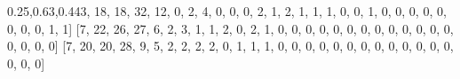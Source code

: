 \documentclass[
]{article}
\newenvironment{Shaded}{}{}
\newcommand{\DecValTok}[1]{\textcolor[rgb]{0.25,0.63,0.44}{#1}}
\newcommand{\NormalTok}[1]{#1}
\begin{document}
\begin{Shaded}
\begin{Highlighting}[]
\NormalTok{[}\DecValTok{3}\NormalTok{, }\DecValTok{18}\NormalTok{, }\DecValTok{18}\NormalTok{, }\DecValTok{32}\NormalTok{, }\DecValTok{12}\NormalTok{, }\DecValTok{0}\NormalTok{, }\DecValTok{2}\NormalTok{, }\DecValTok{4}\NormalTok{, }\DecValTok{0}\NormalTok{, }\DecValTok{0}\NormalTok{, }\DecValTok{0}\NormalTok{, }\DecValTok{2}\NormalTok{, }\DecValTok{1}\NormalTok{, }\DecValTok{2}\NormalTok{, }
\DecValTok{1}\NormalTok{, }\DecValTok{1}\NormalTok{, }\DecValTok{1}\NormalTok{, }\DecValTok{0}\NormalTok{, }\DecValTok{0}\NormalTok{, }\DecValTok{1}\NormalTok{, }\DecValTok{0}\NormalTok{, }\DecValTok{0}\NormalTok{, }\DecValTok{0}\NormalTok{, }\DecValTok{0}\NormalTok{, }\DecValTok{0}\NormalTok{, }\DecValTok{0}\NormalTok{, }\DecValTok{0}\NormalTok{, }\DecValTok{0}\NormalTok{, }\DecValTok{1}\NormalTok{, }\DecValTok{1}\NormalTok{]}
\NormalTok{[}\DecValTok{7}\NormalTok{, }\DecValTok{22}\NormalTok{, }\DecValTok{26}\NormalTok{, }\DecValTok{27}\NormalTok{, }\DecValTok{6}\NormalTok{, }\DecValTok{2}\NormalTok{, }\DecValTok{3}\NormalTok{, }\DecValTok{1}\NormalTok{, }\DecValTok{1}\NormalTok{, }\DecValTok{2}\NormalTok{, }\DecValTok{0}\NormalTok{, }\DecValTok{2}\NormalTok{, }\DecValTok{1}\NormalTok{, }\DecValTok{0}\NormalTok{, }\DecValTok{0}\NormalTok{, }
\DecValTok{0}\NormalTok{, }\DecValTok{0}\NormalTok{, }\DecValTok{0}\NormalTok{, }\DecValTok{0}\NormalTok{, }\DecValTok{0}\NormalTok{, }\DecValTok{0}\NormalTok{, }\DecValTok{0}\NormalTok{, }\DecValTok{0}\NormalTok{, }\DecValTok{0}\NormalTok{, }\DecValTok{0}\NormalTok{, }\DecValTok{0}\NormalTok{, }\DecValTok{0}\NormalTok{, }\DecValTok{0}\NormalTok{, }\DecValTok{0}\NormalTok{, }\DecValTok{0}\NormalTok{]}
\NormalTok{[}\DecValTok{7}\NormalTok{, }\DecValTok{20}\NormalTok{, }\DecValTok{20}\NormalTok{, }\DecValTok{28}\NormalTok{, }\DecValTok{9}\NormalTok{, }\DecValTok{5}\NormalTok{, }\DecValTok{2}\NormalTok{, }\DecValTok{2}\NormalTok{, }\DecValTok{2}\NormalTok{, }\DecValTok{2}\NormalTok{, }\DecValTok{0}\NormalTok{, }\DecValTok{1}\NormalTok{, }\DecValTok{1}\NormalTok{, }\DecValTok{1}\NormalTok{, }\DecValTok{0}\NormalTok{,}
 \DecValTok{0}\NormalTok{, }\DecValTok{0}\NormalTok{, }\DecValTok{0}\NormalTok{, }\DecValTok{0}\NormalTok{, }\DecValTok{0}\NormalTok{, }\DecValTok{0}\NormalTok{, }\DecValTok{0}\NormalTok{, }\DecValTok{0}\NormalTok{, }\DecValTok{0}\NormalTok{, }\DecValTok{0}\NormalTok{, }\DecValTok{0}\NormalTok{, }\DecValTok{0}\NormalTok{, }\DecValTok{0}\NormalTok{, }\DecValTok{0}\NormalTok{, }\DecValTok{0}\NormalTok{]}
\end{Highlighting}
\end{Shaded}
\end{document}
